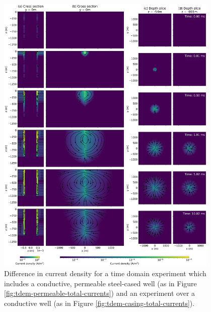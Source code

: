 \begin{figure}
    \begin{center}
    \includegraphics[width=0.95\textwidth]{figures/em_casing/tdem-permeable-secondary-currents.png}
    \end{center}
\caption{
    Difference in current density for a time domain experiment which includes a conductive, permeable steel-cased well (as in Figure \ref{fig:tdem-permeable-total-currents}) and an experiment over a conductive well (as in Figure \ref{fig:tdem-casing-total-currents}).
}
\label{fig:tdem-permeable-secondary-currents}
\end{figure}



